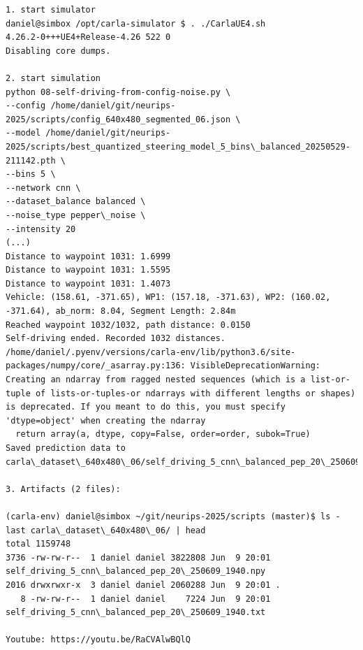 \begin{verbatim}
1. start simulator
daniel@simbox /opt/carla-simulator $ . ./CarlaUE4.sh 
4.26.2-0+++UE4+Release-4.26 522 0
Disabling core dumps.

2. start simulation
python 08-self-driving-from-config-noise.py \
--config /home/daniel/git/neurips-2025/scripts/config_640x480_segmented_06.json \
--model /home/daniel/git/neurips-2025/scripts/best_quantized_steering_model_5_bins\_balanced_20250529-211142.pth \
--bins 5 \
--network cnn \
--dataset_balance balanced \
--noise_type pepper\_noise \
--intensity 20   
(...)
Distance to waypoint 1031: 1.6999
Distance to waypoint 1031: 1.5595
Distance to waypoint 1031: 1.4073
Vehicle: (158.61, -371.65), WP1: (157.18, -371.63), WP2: (160.02, -371.64), ab_norm: 8.04, Segment Length: 2.84m
Reached waypoint 1032/1032, path distance: 0.0150
Self-driving ended. Recorded 1032 distances.
/home/daniel/.pyenv/versions/carla-env/lib/python3.6/site-packages/numpy/core/_asarray.py:136: VisibleDeprecationWarning: Creating an ndarray from ragged nested sequences (which is a list-or-tuple of lists-or-tuples-or ndarrays with different lengths or shapes) is deprecated. If you meant to do this, you must specify 'dtype=object' when creating the ndarray
  return array(a, dtype, copy=False, order=order, subok=True)
Saved prediction data to carla\_dataset\_640x480\_06/self_driving_5_cnn\_balanced_pep_20\_250609_1940.npy

3. Artifacts (2 files):

(carla-env) daniel@simbox ~/git/neurips-2025/scripts (master)$ ls -last carla\_dataset\_640x480\_06/ | head
total 1159748
3736 -rw-rw-r--  1 daniel daniel 3822808 Jun  9 20:01 self_driving_5_cnn\_balanced_pep_20\_250609_1940.npy
2016 drwxrwxr-x  3 daniel daniel 2060288 Jun  9 20:01 .
   8 -rw-rw-r--  1 daniel daniel    7224 Jun  9 20:01 self_driving_5_cnn\_balanced_pep_20\_250609_1940.txt

Youtube: https://youtu.be/RaCVAlwBQlQ

\end{verbatim}

